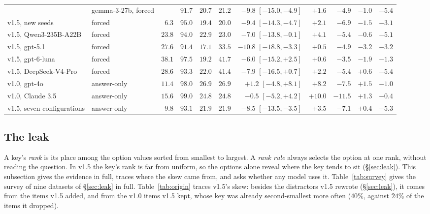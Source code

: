 \documentclass{article}
\begin{document}
\begin{table}[htbp]
{\begin{tabular}{llrrrrrrrrr}
 & gemma-3-27b, forced &  & $91.7$ & $20.7$ & $21.2$ & $-9.8$ {\scriptsize$[-15.0,-4.9]$} & $+1.6$ & $-4.9$ & $-1.0$ & $-5.4$\\
v1.5, new seeds & forced & $6.3$ & $95.0$ & $19.4$ & $20.0$ & $-9.4$ {\scriptsize$[-14.3,-4.7]$} & $+2.1$ & $-6.9$ & $-1.5$ & $-3.1$\\
v1.5, Qwen3-235B-A22B & forced & $23.8$ & $94.0$ & $22.9$ & $23.0$ & $-7.0$ {\scriptsize$[-13.8,-0.1]$} & $+4.1$ & $-5.4$ & $-0.6$ & $-5.1$\\
v1.5, gpt-5.1 & forced & $27.6$ & $91.4$ & $17.1$ & $33.5$ & $-10.8$ {\scriptsize$[-18.8,-3.3]$} & $+0.5$ & $-4.9$ & $-3.2$ & $-3.2$\\
v1.5, gpt-6-luna & forced & $38.1$ & $97.5$ & $19.2$ & $41.7$ & $-6.0$ {\scriptsize$[-15.2,+2.5]$} & $+0.6$ & $-3.5$ & $-1.9$ & $-1.3$\\
v1.5, DeepSeek-V4-Pro & forced & $28.6$ & $93.3$ & $22.0$ & $41.4$ & $-7.9$ {\scriptsize$[-16.5,+0.7]$} & $+2.2$ & $-5.4$ & $+0.6$ & $-5.4$\\
v1.0, gpt-4o & answer-only & $11.4$ & $98.0$ & $26.9$ & $26.9$ & $+1.2$ {\scriptsize$[-4.8,+8.1]$} & $+8.2$ & $-7.5$ & $+1.5$ & $-1.0$\\
v1.0, Claude 3.5 & answer-only & $15.6$ & $99.0$ & $24.8$ & $24.8$ & $-0.5$ {\scriptsize$[-5.2,+4.2]$} & $+10.0$ & $-11.5$ & $+1.3$ & $-0.4$\\
v1.5, seven configurations & answer-only & $9.8$ & $93.1$ & $21.9$ & $21.9$ & $-8.5$ {\scriptsize$[-13.5,-3.5]$} & $+3.5$ & $-7.1$ & $+0.4$ & $-5.3$\\
\bottomrule
\end{tabular}}
\end{table}

\FloatBarrier
\subsection{The leak}
\label{app:arms}

A key's \emph{rank} is its place among the option values sorted from smallest to largest. A \emph{rank rule} always
selects the option at one rank, without reading the question. In v1.5 the key's rank is far from uniform, so the
options alone reveal where the key tends to sit (\S\ref{sec:leak}). This subsection gives the evidence in full, traces
where the skew came from, and asks whether any model uses it. Table~\ref{tab:survey} gives the survey of nine datasets
of \S\ref{sec:leak} in full. Table~\ref{tab:origin} traces v1.5's skew: besides the distractors v1.5 rewrote
(\S\ref{sec:leak}), it comes from the items v1.5 added, and from the v1.0 items v1.5 kept, whose key was already
second-smallest more often ($40\%$, against $24\%$ of the items it dropped).
\end{document}
